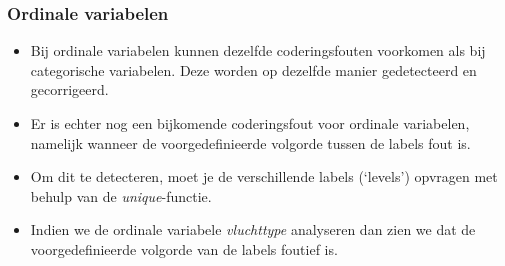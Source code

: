 \documentclass[]{tufte-book}
\newenvironment{Shaded}{}{}
\newcommand{\DataTypeTok}[1]{\textcolor[rgb]{0.56,0.13,0.00}{#1}}
\newcommand{\KeywordTok}[1]{\textcolor[rgb]{0.00,0.44,0.13}{\textbf{#1}}}
\newcommand{\NormalTok}[1]{#1}
\newcommand{\OperatorTok}[1]{\textcolor[rgb]{0.40,0.40,0.40}{#1}}
\newcommand{\StringTok}[1]{\textcolor[rgb]{0.25,0.44,0.63}{#1}}
\providecommand{\tightlist}{%
  \setlength{\itemsep}{0pt}\setlength{\parskip}{0pt}}
\begin{document}
\begin{Shaded}
\end{Shaded}

\begin{Shaded}
\end{Shaded}

\hypertarget{ordinale-variabelen}{%
\subsubsection{Ordinale variabelen}\label{ordinale-variabelen}}

\begin{itemize}
\tightlist
\item
  Bij ordinale variabelen kunnen dezelfde coderingsfouten voorkomen als bij categorische variabelen. Deze worden op dezelfde manier gedetecteerd en gecorrigeerd.
\item
  Er is echter nog een bijkomende coderingsfout voor ordinale variabelen, namelijk wanneer de voorgedefinieerde volgorde tussen de labels fout is.
\item
  Om dit te detecteren, moet je de verschillende labels (`levels') opvragen met behulp van de \emph{unique}-functie.
\item
  Indien we de ordinale variabele \emph{vluchttype} analyseren dan zien we dat de voorgedefinieerde volgorde van de labels foutief is.
\end{itemize}

\begin{Shaded}
\end{Shaded}
\end{document}
